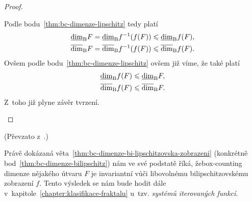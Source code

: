 \begin{proof}
\begin{enumerate}[label=\textit{(\roman*)}]
        Podle bodu~\ref{thm:bc-dimenze-lipschitz} tedy platí
        \begin{align*}
            \underline{\dim}_\textup{B}{F}&=\underline{\dim}_\textup{B}{f^{-1}(f(F))}\leqslant\underline{\dim}_\textup{B}{f(F)},\\
            \overline{\dim}_\textup{B}{F}&=\overline{\dim}_\textup{B}{f^{-1}(f(F))}\leqslant\overline{\dim}_\textup{B}{f(F)}.
        \end{align*}
        Ovšem podle bodu~\ref{thm:bc-dimenze-lipschitz} ovšem již víme, že také platí
        \begin{align*}
            \underline{\dim}_\textup{B}{f(F)}&\leqslant\underline{\dim}_\textup{B}{F},\\
            \overline{\dim}_\textup{B}{f(F)}&\leqslant\overline{\dim}_\textup{B}{F}.
        \end{align*}
        Z~toho již plyne závěr tvrzení.
    \end{enumerate}
\end{proof}
(Převzato z~\citep[str. 36]{Falconer2014}.)

Právě dokázaná věta~\ref{thm:bc-dimenze-bi-lipschitzovska-zobrazeni} (konkrétně bod~\ref{thm:bc-dimenze-bilipschitz}) nám ve své podstatě říká, že\linebreak{}box-counting dimenze nějakého útvaru $F$ je invariantní vůči libovolnému bilipschitzovskému zobrazení $f$. Tento výsledek se nám bude hodit dále v~kapitole~\ref{chapter:klasifikace-fraktalu} u~tzv. \emph{systémů iterovaných funkcí}.